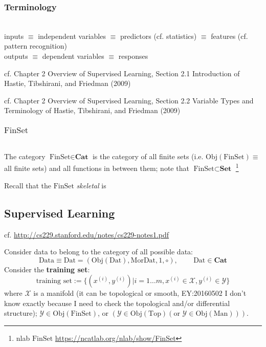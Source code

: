 \documentclass[10pt]{amsart}
\begin{document}
\begin{multicols*}{2}
\subsubsection{Terminology} \quad \\ 
inputs $\equiv $ independent variables $\equiv $ predictors (cf. statistics) $ \equiv $ features (cf. pattern recognition) \\
outputs $\equiv $ dependent variables $\equiv $ responses

cf. Chapter 2 Overview of Supervised Learning, Section 2.1 Introduction of Hastie, Tibshirani, and Friedman (2009) \cite{HTF2009}

cf. Chapter 2 Overview of Supervised Learning, Section 2.2 Variable Types and Terminology  of Hastie, Tibshirani, and Friedman (2009) \cite{HTF2009}

\subsubsection{$\text{FinSet}$} \quad \\ 
The category $\text{FinSet} \in \mathbf{\text{Cat}}$ is the category of all finite sets (i.e. $\text{Obj}(\text{FinSet}) \equiv $ all finite sets) and all functions in between them; note that $\text{FinSet} \subset \mathbf{\text{Set}}$ \footnote{nlab $\text{FinSet}$ \url{https://ncatlab.org/nlab/show/FinSet}}

Recall that the $\text{FinSet}$ \emph{skeletal} is


\subsection{Supervised Learning}

cf. \url{http://cs229.stanford.edu/notes/cs229-notes1.pdf}

Consider data to belong to the category of all possible data:
\[
\text{Data} \equiv \text{Dat} = (\text{Obj}(\text{Dat}), \text{Mor}\text{Dat}, 1, \circ), \qquad \, \text{Dat} \in \mathbf{\text{Cat}}
\]
Consider the \textbf{training set}:
\[
\text{training set} := \lbrace (x^{(i)},y^{(i)}) | i  =1 \dots m , x^{(i)} \in \mathcal{X}, y^{(i)} \in \mathcal{Y} \rbrace
\]
where $\mathcal{X}$ is a manifold (it can be topological or smooth, EY:20160502 I don't know exactly because I need to check the topological and/or differential structure); $\mathcal{Y} \in \text{Obj}(\text{FinSet})$, or $(\mathcal{Y} \in \text{Obj}(\text{Top}) (\text{or } \mathcal{Y} \in \text{Obj}(\text{Man})))$.  


\end{multicols*}
\end{document}
